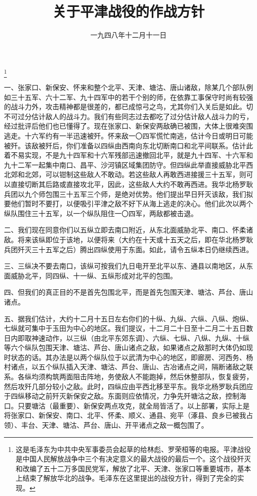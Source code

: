 
\title{关于平津战役的作战方针}
\date{一九四八年十二月十一日}
\thanks{这是毛泽东为中共中央军事委员会起草的给林彪、罗荣桓等的电报。平津战役是中国人民解放战争中三个有决定意义的最大战役的最后一个。这个战役歼灭和改编了五十二万多国民党军，解放了北平、天津、张家口等重要城市，基本上结束了解放华北的战争。毛泽东在这里提出的战役方针，得到了完全的实现。}
\maketitle


一、张家口、新保安、怀来和整个北平、天津、塘沽、唐山诸敌，除某几个部队例如三十五军、六十二军、九十四军中的若干个别的师，在依靠工事保守时尚有较强的战斗力外，攻击精神都是很差的，都已成惊弓之鸟，尤其你们入关后是如此。切不可过分估计敌人的战斗力。我们有些同志过去都吃了过分估计敌人战斗力的亏，经过批评后他们也已懂得了。现在张家口、新保安两敌确已被围，大体上很难突围逃走。十六军约有一半迅速被歼。怀来敌一〇四军慌忙南逃，估计今日或明日可能被歼。该敌被歼后，你们准备以四纵由西南向东北切断南口和北平间联系。估计此着不易实现，不是九十四军和十六军残部迅速撤回北平，就是九十四军、十六军和九十二军一起集中南口、昌平、沙河镇区域集团防守。但四纵此举直接威胁北平西北郊和北郊，可以钳制这些敌人不敢动。若这些敌人再敢西进接援三十五军，则可以直接切断其后路或直接攻北平，因此，这些敌人大约不敢再西进。我华北杨罗耿兵团以九个师包围三十五军三个师，是绝对优势。他们提出早日歼灭该敌，我们拟要他们暂时不要打，以便吸引平津之敌不好下从海上逃走的决心。他们此次以两个纵队围住三十五军，以一个纵队阻住一〇四军，两敌都被击退。

二、我们现在同意你们以五纵立即去南口附近，从东北面威胁北平、南口、怀柔诸敌。将来该纵即位于该地，以便将来（大约在十天或十五天之后，即在华北杨罗耿兵团歼灭三十五军之后）腾出四纵使用于东面。如此，请令五纵本日仍继续西进。

三、三纵决不要去南口，该纵可按我们九日电开至北平以东、通县以南地区，从东面威胁北平，同四纵、十一纵、五纵形成对北平的包围。

四、但我们的真正目的不是首先包围北平，而是首先包围天津、塘沽、芦台、唐山诸点。

五、据我们估计，大约十二月十五日左右你们的十纵、九纵、六纵、八纵、炮纵、七纵就可集中于玉田为中心的地区。我们提议，十二月二十日至十二月二十五日数日内即取神速动作，以三纵（由北平东郊东调）、六纵、七纵、八纵、九纵、十纵等六个纵队包围天津、塘沽、芦台、唐山诸点之敌，如果诸点之敌那时大体仍如现时状态的话。其办法是以两个纵队位于以武清为中心的地区，即廊房、河西务、杨村诸点，以五个纵队插入天津、塘沽、芦台、唐山、古冶诸点之间，隔断诸敌之联系。各纵均须构筑两面阻击阵地，务使敌人不能跑掉，然后休整部队，恢复疲劳，然后攻歼几部分较小之敌。此时，四纵应由平西北移至平东。我华北杨罗耿兵团应于四纵移动之前歼灭新保安之敌。东面则应依情况，力争先歼塘沽之敌，控制海口。只要塘沽（最重要）、新保安两点攻克，就全局皆活了。以上部署，实际上是将张家口、新保安、南口、北平、怀柔、顺义、通县、宛平（涿县、良乡已被我占领）、丰台、天津、塘沽、芦台、唐山、开平诸点之敌一概包围了。

